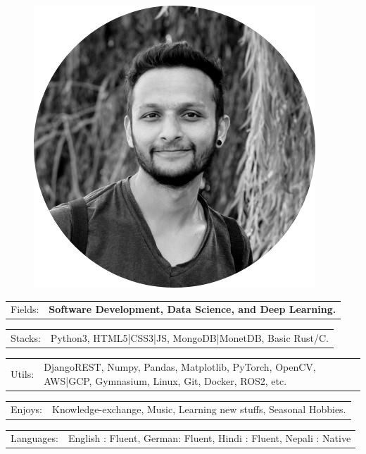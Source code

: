 \documentclass[10pt,A4]{article}
\newcommand{\tzlarrow}{(0,0) -- (0.2,0) -- (0.3,0.2) -- (0.2,0.4) -- (0,0.4) -- (0.1,0.2) -- cycle;}
\newcommand{\larrow}[1]
{\begin{tikzpicture}[scale=0.58]
	 \filldraw[fill=#1!100,draw=#1!100!black]  \tzlarrow
 \end{tikzpicture}
}
\newcommand{\metasection}[2]
{
\begin{tabular*}{1\textwidth}{p{2.4cm} p{11cm}}
\larrow{bgcol}	\normalsize{\textcolor{sectcol}{#1}}&#2\\[12pt]
\end{tabular*}
}
\begin{document}
\pagestyle{fancy}


\vspace{-20.55pt}


\hspace{-0.25\linewidth}\colorbox{bgcol}{}



\begin{figure}[H]
\begin{flushright}
	\includegraphics[width=0.20\linewidth]{profile.png}	%
\end{flushright}
\end{figure}



\vspace{-130pt}

\metasection{Fields:}{\textbf{Software Development, Data Science, and Deep Learning.}}
\metasection{Stacks:}{Python3, HTML5|CSS3|JS, MongoDB|MonetDB, Basic Rust/C.}
\vspace{5pt}
\metasection{Utils:}{DjangoREST, Numpy, Pandas, Matplotlib, PyTorch, OpenCV, AWS|GCP,
	Gymnasium, Linux, Git, Docker, ROS2, etc. }
\metasection{Enjoys:}{Knowledge-exchange, Music, Learning new stuffs, Seasonal Hobbies. }
\metasection{Languages:}{English : Fluent, German: Fluent, Hindi : Fluent, Nepali : Native}
\end{document}
